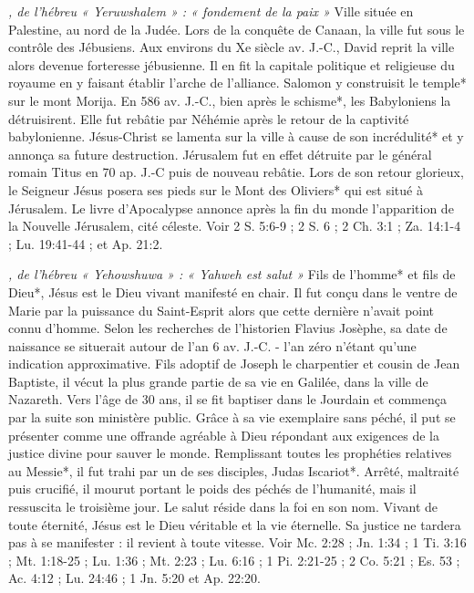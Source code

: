 \begin{multicols}{2}
{\textit{, de l'hébreu « Yeruwshalem » : « fondement de la paix »}\newline
Ville située en Palestine, au nord de la Judée. Lors de la conquête de Canaan, la ville fut sous le contrôle des Jébusiens. Aux environs du Xe siècle av. J.-C., David reprit la ville alors devenue forteresse jébusienne. Il en fit la capitale politique et religieuse du royaume en y faisant établir l'arche de l'alliance. Salomon y construisit le temple* sur le mont Morija. En 586 av. J.-C., bien après le schisme*, les Babyloniens la détruisirent. Elle fut rebâtie par Néhémie après le retour de la captivité babylonienne. Jésus-Christ se lamenta sur la ville à cause de son incrédulité* et y annonça sa future destruction. Jérusalem fut en effet détruite par le général romain Titus en 70 ap. J.-C puis de nouveau rebâtie. Lors de son retour glorieux, le Seigneur Jésus posera ses pieds sur le Mont des Oliviers* qui est situé à Jérusalem. Le livre d'Apocalypse annonce après la fin du monde l'apparition de la Nouvelle Jérusalem, cité céleste. Voir 2 S. 5:6-9 ; 2 S. 6 ; 2 Ch. 3:1 ; Za. 14:1-4 ; Lu. 19:41-44 ; et Ap. 21:2.

\textit{, de l'hébreu « Yehowshuwa » : « Yahweh est salut »}\newline
Fils de l'homme* et fils de Dieu*, Jésus est le Dieu vivant manifesté en chair. Il fut conçu dans le ventre de Marie par la puissance du Saint-Esprit alors que cette dernière n'avait point connu d'homme. Selon les recherches de l'historien Flavius Josèphe, sa date de naissance se situerait autour de l'an 6 av. J.-C. - l'an zéro n'étant qu'une indication approximative. Fils adoptif de Joseph le charpentier et cousin de Jean Baptiste, il vécut la plus grande partie de sa vie en Galilée, dans la ville de Nazareth. Vers l'âge de 30 ans, il se fit baptiser dans le Jourdain et commença par la suite son ministère public. Grâce à sa vie exemplaire sans péché, il put se présenter comme une offrande agréable à Dieu répondant aux exigences de la justice divine pour sauver le monde. Remplissant toutes les prophéties relatives au Messie*, il fut trahi par un de ses disciples, Judas Iscariot*. Arrêté, maltraité puis crucifié, il mourut portant le poids des péchés de l'humanité, mais il ressuscita le troisième jour. Le salut réside dans la foi en son nom. Vivant de toute éternité, Jésus est le Dieu véritable et la vie éternelle. Sa justice ne tardera pas à se manifester : il revient à toute vitesse. Voir Mc. 2:28 ; Jn. 1:34 ; 1 Ti. 3:16 ; Mt. 1:18-25 ; Lu. 1:36 ; Mt. 2:23 ; Lu. 6:16 ; 1 Pi. 2:21-25 ; 2 Co. 5:21 ; Es. 53 ; Ac. 4:12 ; Lu. 24:46 ; 1 Jn. 5:20 et Ap. 22:20.

}
\end{multicols}
